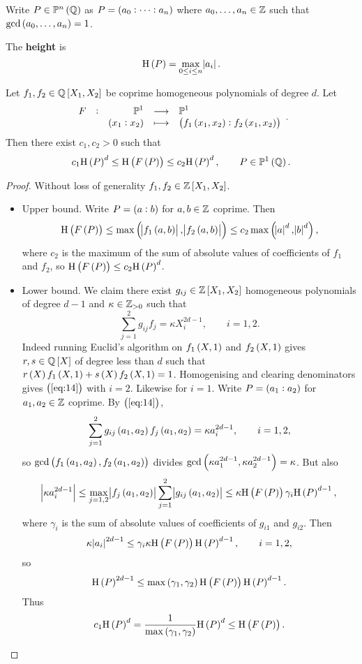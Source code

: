 Write $ P \in \PP^n\br{\QQ} $ as $ P = \br{a_0 : \dots : a_n} $ where $ a_0, \dots, a_n \in \mathbb{Z} $ such that $ \gcd\br{a_0, \dots, a_n} = 1 $.

\begin{definition*}
The \textbf{height} is
$$ \H\br{P} = \max_{0 \le i \le n} \abs{a_i}. $$
\end{definition*}

\begin{lemma}
\label{lem:13.1}
Let $ f_1, f_2 \in \QQ\sbr{X_1, X_2} $ be coprime homogeneous polynomials of degree $ d $. Let
$$ \function[F]{\PP^1}{\PP^1}{\br{x_1 : x_2}}{\br{f_1\br{x_1, x_2} : f_2\br{x_1, x_2}}}. $$
Then there exist $ c_1, c_2 > 0 $ such that
$$ c_1\H\br{P}^d \le \H\br{F\br{P}} \le c_2\H\br{P}^d, \qquad P \in \PP^1\br{\QQ}. $$
\end{lemma}

\begin{proof}
Without loss of generality $ f_1, f_2 \in \ZZ\sbr{X_1, X_2} $.
\begin{itemize}
\item Upper bound. Write $ P = \br{a : b} $ for $ a, b \in \mathbb{Z} $ coprime. Then
$$ \H\br{F\br{P}} \le \max\br{\abs{f_1\br{a, b}}, \abs{f_2\br{a, b}}} \le c_2\max\br{\abs{a}^d, \abs{b}^d}, $$
where $ c_2 $ is the maximum of the sum of absolute values of coefficients of $ f_1 $ and $ f_2 $, so $ \H\br{F\br{P}} \le c_2\H\br{P}^d $.
\item Lower bound. We claim there exist $ g_{ij} \in \ZZ\sbr{X_1, X_2} $ homogeneous polynomials of degree $ d - 1 $ and $ \kappa \in \mathbb{Z}_{> 0} $ such that
\begin{equation}
\label{eq:14}
\sum_{j = 1}^2 g_{ij}f_j = \kappa X_i^{2d - 1}, \qquad i = 1, 2.
\end{equation}
Indeed running Euclid's algorithm on $ f_1\br{X, 1} $ and $ f_2\br{X, 1} $ gives $ r, s \in \QQ\sbr{X} $ of degree less than $ d $ such that $ r\br{X}f_1\br{X, 1} + s\br{X}f_2\br{X, 1} = 1 $. Homogenising and clearing denominators gives $ \br{\ref{eq:14}} $ with $ i = 2 $. Likewise for $ i = 1 $. Write $ P = \br{a_1 : a_2} $ for $ a_1, a_2 \in \mathbb{Z} $ coprime. By $ \br{\ref{eq:14}} $,
$$ \sum_{j = 1}^2 g_{ij}\br{a_1, a_2}f_j\br{a_1, a_2} = \kappa a_i^{2d - 1}, \qquad i = 1, 2, $$
so $ \gcd\br{f_1\br{a_1, a_2}, f_2\br{a_1, a_2}} $ divides $ \gcd\br{\kappa a_1^{2d - 1}, \kappa a_2^{2d - 1}} = \kappa $. But also
$$ \abs{\kappa a_i^{2d - 1}} \le \max_{j = 1, 2} \abs{f_j\br{a_1, a_2}}\sum_{j = 1}^2 \abs{g_{ij}\br{a_1, a_2}} \le \kappa\H\br{F\br{P}}\gamma_i\H\br{P}^{d - 1}, $$
where $ \gamma_i $ is the sum of absolute values of coefficients of $ g_{i1} $ and $ g_{i2} $. Then
$$ \kappa\abs{a_i}^{2d - 1} \le \gamma_i\kappa\H\br{F\br{P}}\H\br{P}^{d - 1}, \qquad i = 1, 2, $$
so
$$ \H\br{P}^{2d - 1} \le \max\br{\gamma_1, \gamma_2}\H\br{F\br{P}}\H\br{P}^{d - 1}. $$
Thus
$$ c_1\H\br{P}^d = \dfrac{1}{\max\br{\gamma_1, \gamma_2}}\H\br{P}^d \le \H\br{F\br{P}}. $$
\end{itemize}
\end{proof}

